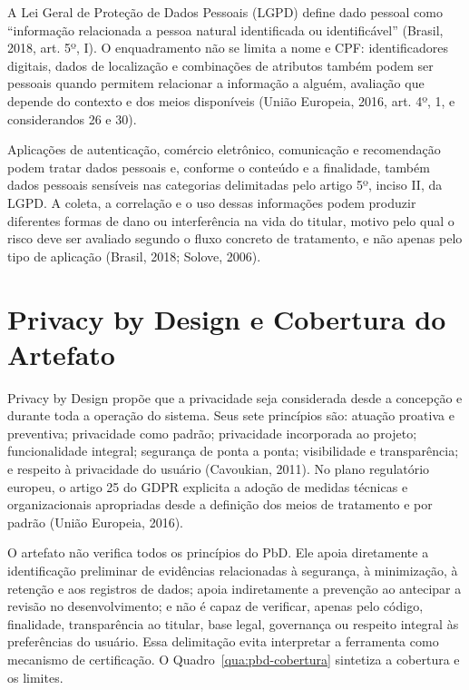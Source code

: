 \documentclass[12pt,a4paper,oneside]{report}
\begin{document}
A Lei Geral de Proteção de Dados Pessoais (LGPD) define dado pessoal como ``informação relacionada a pessoa natural identificada ou identificável'' (Brasil, 2018, art. 5º, I). O enquadramento não se limita a nome e CPF: identificadores digitais, dados de localização e combinações de atributos também podem ser pessoais quando permitem relacionar a informação a alguém, avaliação que depende do contexto e dos meios disponíveis (União Europeia, 2016, art. 4º, 1, e considerandos 26 e 30).

Aplicações de autenticação, comércio eletrônico, comunicação e recomendação podem tratar dados pessoais e, conforme o conteúdo e a finalidade, também dados pessoais sensíveis nas categorias delimitadas pelo artigo 5º, inciso II, da LGPD. A coleta, a correlação e o uso dessas informações podem produzir diferentes formas de dano ou interferência na vida do titular, motivo pelo qual o risco deve ser avaliado segundo o fluxo concreto de tratamento, e não apenas pelo tipo de aplicação (Brasil, 2018; Solove, 2006).

\section{Privacy by Design e Cobertura do Artefato}

Privacy by Design propõe que a privacidade seja considerada desde a concepção e durante toda a operação do sistema. Seus sete princípios são: atuação proativa e preventiva; privacidade como padrão; privacidade incorporada ao projeto; funcionalidade integral; segurança de ponta a ponta; visibilidade e transparência; e respeito à privacidade do usuário (Cavoukian, 2011). No plano regulatório europeu, o artigo 25 do GDPR explicita a adoção de medidas técnicas e organizacionais apropriadas desde a definição dos meios de tratamento e por padrão (União Europeia, 2016).

O artefato não verifica todos os princípios do PbD. Ele apoia diretamente a identificação preliminar de evidências relacionadas à segurança, à minimização, à retenção e aos registros de dados; apoia indiretamente a prevenção ao antecipar a revisão no desenvolvimento; e não é capaz de verificar, apenas pelo código, finalidade, transparência ao titular, base legal, governança ou respeito integral às preferências do usuário. Essa delimitação evita interpretar a ferramenta como mecanismo de certificação. O Quadro~\ref{qua:pbd-cobertura} sintetiza a cobertura e os limites.
\end{document}
